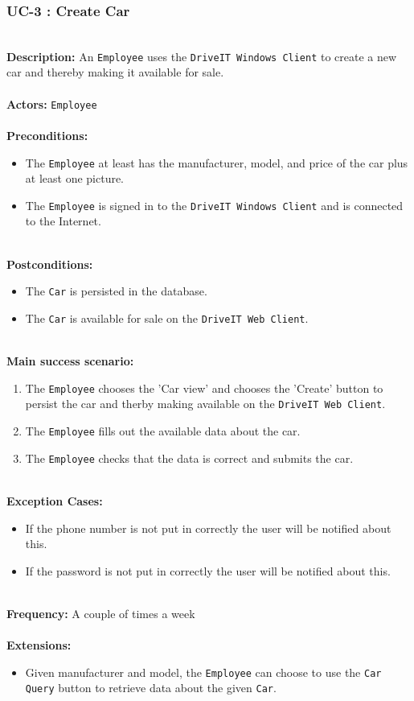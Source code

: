 \subsubsection{UC-3 : Create Car}
\label{create-car-use-case}
\HRule \\[0.4cm]
\textbf{Description:} An \texttt{Employee} uses the \texttt{DriveIT Windows Client} to create a new car and thereby making it available for sale. \\
\HRule \\[0.4cm]
\textbf{Actors:} \texttt{Employee}\\
\HRule \\[0.4cm]
\textbf{Preconditions:} 
\begin{itemize}
    \item The \texttt{Employee} at least has the manufacturer, model, and price of the car plus at least one picture.
    \item The \texttt{Employee} is signed in to the \texttt{DriveIT Windows Client} and is connected to the Internet.
\end{itemize}
\HRule \\[0.4cm]
\textbf{Postconditions:}
\begin{itemize}
    \item The \texttt{Car} is persisted in the database.
    \item The \texttt{Car} is available for sale on the \texttt{DriveIT Web Client}.
\end{itemize}
\HRule \\[0.4cm]
\textbf{Main success scenario:}
\begin{enumerate}
    \item The \texttt{Employee} chooses the 'Car view' and chooses the 'Create' button to persist the car and therby making available on the \texttt{DriveIT Web Client}.
    \item The \texttt{Employee} fills out the available data about the car.
    \item The \texttt{Employee} checks that the data is correct and submits the car.
\end{enumerate}
\HRule \\[0.4cm]
\textbf{Exception Cases:}
\begin{itemize}
	\item If the phone number is not put in correctly the user will be notified about this.
	\item If the password is not put in correctly the user will be notified about this.
\end{itemize}
\HRule \\[0.4cm]
\textbf{Frequency:}
A couple of times a week \\
\HRule \\[0.4cm]
\textbf{Extensions:}
\begin{itemize}
	\item Given manufacturer and model, the \texttt{Employee} can choose to use the \texttt{Car Query} button to retrieve data about the given \texttt{Car}.
\end{itemize}
\HRule \\[0.4cm]
